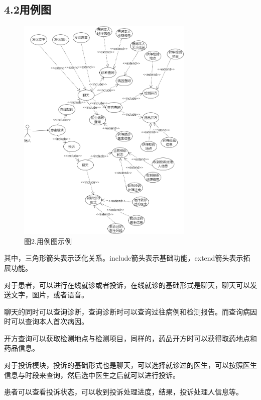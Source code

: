 \documentclass[24pt,a4paper]{article}%
\begin{document}
\subsection*{\songti 4.2用例图}
\begin{figure}[H]
    \centering
    \includegraphics[width=0.75\textwidth]{images/example.png}
    \caption*{图2.用例图示例}
\end{figure}
其中，三角形箭头表示泛化关系。include箭头表示基础功能，extend箭头表示拓展功能。\par
对于患者，可以进行在线就诊或者投诉，在线就诊的基础形式是聊天，聊天可以发送文字，图片，或者语音。\par
聊天的同时可以查询诊断，查询诊断时可以查询过往病例和检测报告。而查询病因时可以查询本人首次病因。\par
开方查询可以获取检测地点与检测项目，同样的，药品开方时可以获得取药地点和药品信息。\par
对于投诉模块，投诉的基础形式也是聊天，可以选择就诊过的医生，可以按照医生信息与时段来查询，然后选中医生之后就可以进行投诉。\par
患者可以查看投诉状态，可以收到投诉处理进度，结果，投诉处理人信息等。\par
\end{document}
